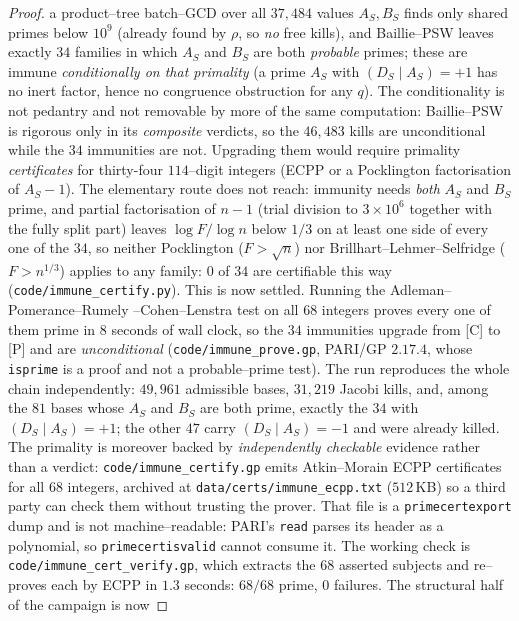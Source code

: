 \documentclass[11pt]{article}
\theoremstyle{definition}
\begin{document}
\begin{proof}
a product--tree batch--GCD over all $37{,}484$ values $A_S,B_S$ finds only shared primes below
$10^9$ (already found by $\rho$, so \emph{no} free kills), and Baillie--PSW leaves exactly
$34$ families in which $A_S$ and $B_S$ are both \emph{probable} primes; these are immune
\emph{conditionally on that primality} (a prime $A_S$ with $(D_S\mid A_S)=+1$ has no inert factor,
hence no congruence obstruction for any $q$). The conditionality is not pedantry and not
removable by more of the same computation: Baillie--PSW is rigorous only in its \emph{composite}
verdicts, so the $46{,}483$ kills are unconditional while the $34$ immunities are not. Upgrading them
would require primality \emph{certificates} for thirty-four $114$--digit integers (ECPP or a
Pocklington factorisation of $A_S-1$). The elementary route does not reach: immunity needs
\emph{both} $A_S$ and $B_S$ prime, and partial factorisation of $n-1$ (trial division to
$3\times10^6$ together with the fully split part) leaves $\log F/\log n$ below $1/3$ on at least one
side of every one of the $34$, so neither Pocklington ($F>\sqrt n$) nor
Brillhart--Lehmer--Selfridge ($F>n^{1/3}$) applies to any family: $0$ of $34$ are certifiable this
way (\texttt{code/immune\_certify.py}). This is now settled. Running the Adleman--Pomerance--Rumely
--Cohen--Lenstra test on all $68$ integers proves every one of them prime in $8$ seconds of
wall clock, so the $34$ immunities upgrade from \textup{[C]} to \textup{[P]} and are
\emph{unconditional} (\texttt{code/immune\_prove.gp}, PARI/GP $2.17.4$, whose \texttt{isprime} is a
proof and not a probable--prime test). The run reproduces the whole chain independently: $49{,}961$
admissible bases, $31{,}219$ Jacobi kills, and, among the $81$ bases whose $A_S$ and $B_S$ are both
prime, exactly the $34$ with $(D_S\mid A_S)=+1$; the other $47$ carry $(D_S\mid A_S)=-1$ and were
already killed. The primality is moreover backed by
\emph{independently checkable} evidence rather than a verdict: \texttt{code/immune\_certify.gp}
emits Atkin--Morain \textup{ECPP} certificates for all $68$ integers, archived at
\texttt{data/certs/immune\_ecpp.txt} ($512$\,KB) so a third
party can check them without trusting the prover. That file is a \texttt{primecertexport} dump and
is not machine--readable: PARI's \texttt{read} parses its header as a polynomial, so
\texttt{primecertisvalid} cannot consume it. The working check is
\texttt{code/immune\_cert\_verify.gp}, which extracts the $68$ asserted subjects and re--proves each
by \textup{ECPP} in $1.3$ seconds: $68/68$ prime, $0$ failures. The structural half of the campaign is now

\end{proof}
\end{document}
